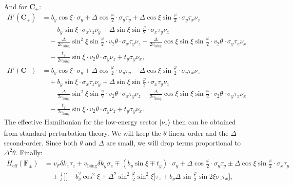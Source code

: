 \begin{subappendices}
\begin{align}
				\end{align}
				And for $\bm{C}_\pm$:
				\begin{align}
					H'(\bm{C}_+)&=b_y\cos\xi\cdot\sigma_y+\Delta\cos\frac{\varphi}{2}\cdot\sigma_y\tau_y+\Delta\cos\xi\sin\frac{\varphi}{2}\cdot\sigma_y\tau_x\nu_z\nonumber\\
                    &\quad-b_y\sin\xi\cdot\sigma_x\tau_z\nu_y+\Delta\sin\xi\sin\frac{\varphi}{2}\cdot\sigma_x\tau_y\nu_x\nonumber\\
					&\quad-\frac{\Delta}{2v_{\text{Ising}}}\sin^2\xi\sin\frac{\varphi}{2} \cdot v_2\theta\cdot\sigma_x\tau_y\nu_z+\frac{\Delta}{2v_{\text{Ising}}}\cos\xi\sin\xi \sin\frac{\varphi}{2} \cdot v_2\theta\cdot \sigma_y\tau_x\nu_x\nonumber\\
                    &\quad-\frac{t_y}{2v_{\text{Ising}}}\sin\xi\cdot v_2\theta\cdot\sigma_y\nu_z+t_y\sigma_y\nu_x,\label{H' for P+}\\
					H'(\bm{C}_-)&=b_y\cos\xi\cdot\sigma_y+\Delta\cos\frac{\varphi}{2}\cdot\sigma_y\tau_y-\Delta\cos\xi\sin\frac{\varphi}{2}\cdot\sigma_y\tau_x\nu_z\nonumber\\
                    &\quad+b_y\sin\xi\cdot\sigma_x\tau_z\nu_y+\Delta\sin\xi\sin\frac{\varphi}{2}\cdot\sigma_x\tau_y\nu_x \nonumber\\
					&\quad-\frac{\Delta}{2v_{\text{Ising}}}\sin^2\xi\sin\frac{\varphi}{2} \cdot v_2\theta\cdot\sigma_x\tau_y\nu_z -\frac{\Delta}{2v_{\text{Ising}}}\cos\xi\sin\xi \sin\frac{\varphi}{2} \cdot v_2\theta\cdot \sigma_y\tau_x\nu_x\nonumber\\
                    &\quad-\frac{t_y}{2v_{\text{Ising}}}\sin\xi\cdot v_2\theta\cdot\sigma_y\nu_z+t_y\sigma_y\nu_x.\label{H' for P-}
				\end{align}
				The effective Hamiltonian for the low-energy sector $|\nu_\uparrow\rangle$ then can be obtained from standard perturbation theory. We will keep the $\theta$-linear-order and the $\Delta$-second-order. Since both $\theta$ and $\Delta$ are small, we will drop terms proportional to $\Delta^2\theta$. Finally:
				\begin{align}
					H_{\text{eff}}(\bm{F}_\pm)&=v_F\delta k_x \tau_z+v_{\text{Ising}}\delta k_y \sigma_z\mp (b_y\sin\xi\mp t_y)\cdot\sigma_y+\Delta\cos\frac{\varphi}{2}\cdot\sigma_y\tau_y\pm\Delta\cos\xi\sin\frac{\varphi}{2}\cdot\sigma_x\tau_y\nonumber\\
					&\quad\pm\frac{1}{\Gamma}\Big[\big[-b_y^2\cos^2\xi+\Delta^2\sin^2\frac{\varphi}{2}\sin^2\xi\big]\tau_z+b_y\Delta\sin\frac{\varphi}{2}\sin 2\xi\sigma_z\tau_x\Big],\label{Heff for Q+ and Q-}\\

\end{align}
\end{subappendices}
